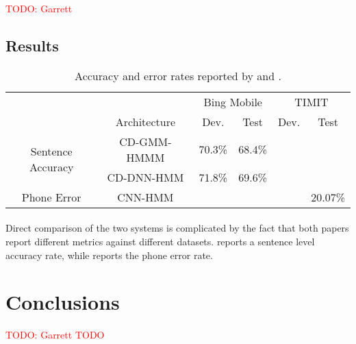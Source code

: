 \documentclass[letterpaper]{article}
\newcommand{\TODO}[1]{\textcolor{red}{TODO: #1}}
\begin{document}
\TODO{Garrett}

\subsection*{Results}

\begin{table}[H]
	\centering
	\begin{tabular}{c|c|c|c|c|c}
		& & \multicolumn{2}{c|}{Bing Mobile} & \multicolumn{2}{c}{TIMIT}\\
		& Architecture & Dev. & Test  & Dev. & Test \\
		\hline
		\multirow{2}{*}{Sentence Accuracy} & CD-GMM-HMMM & 70.3\% & 68.4\% & & \\
		& CD-DNN-HMM & 71.8\% & 69.6\% & & \\
		\hline
		Phone Error & CNN-HMM  & & &  & 20.07\%
	\end{tabular}
	\caption{Accuracy and error rates reported by \cite{DBLP:journals/taslp/DahlYDA12} and \cite{DBLP:journals/taslp/Abdel-HamidMJDPY14}.}
	\label{tbl:results}
\end{table}

\paragraph{} Direct comparison of the two systems is complicated by the fact that both papers report different metrics against different datasets. \cite{DBLP:journals/taslp/DahlYDA12} reports a sentence level accuracy rate, while \cite{DBLP:journals/taslp/Abdel-HamidMJDPY14} reports the phone error rate.

\section*{Conclusions} \TODO{Garrett TODO}

\appendix

\singlespacing



\end{document}
